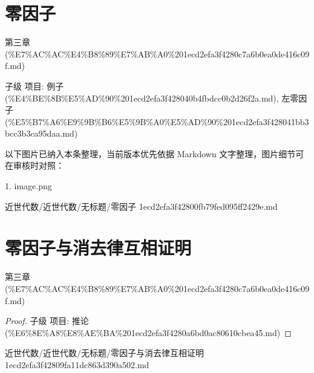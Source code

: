 \section*{零因子}

\begin{note}[来源上级主题]

第三章 (\%E7\%AC\%AC\%E4\%B8\%89\%E7\%AB\%A0\%201ecd2efa3f4280c7a6b0ea0de416c09f.md)

\end{note}

\begin{note}[零因子]

子级 项目: 例子 (\%E4\%BE\%8B\%E5\%AD\%90\%201ecd2efa3f428040b4fbdcc0b2d26f2a.md), 左零因子 (\%E5\%B7\%A6\%E9\%9B\%B6\%E5\%9B\%A0\%E5\%AD\%90\%201ecd2efa3f428041bb3bcc3b3ca95daa.md)

\end{note}

\begin{note}[关联图片]
以下图片已纳入本条整理，当前版本优先依据 Markdown 文字整理，图片细节可在审核时对照：

1. image.png\\

\end{note}

\begin{note}[来源路径]

近世代数/近世代数/无标题/零因子 1ecd2efa3f42800fb79fed095ff2429e.md

\end{note}

\section*{零因子与消去律互相证明}

\begin{note}[来源上级主题]

第三章 (\%E7\%AC\%AC\%E4\%B8\%89\%E7\%AB\%A0\%201ecd2efa3f4280c7a6b0ea0de416c09f.md)

\end{note}

\begin{proof}

子级 项目: 推论 (\%E6\%8E\%A8\%E8\%AE\%BA\%201ecd2efa3f4280a6bd0ac80610cbea45.md)

\end{proof}

\begin{note}[来源路径]

近世代数/近世代数/无标题/零因子与消去律互相证明 1ecd2efa3f42809fa11dc863d390a502.md

\end{note}

